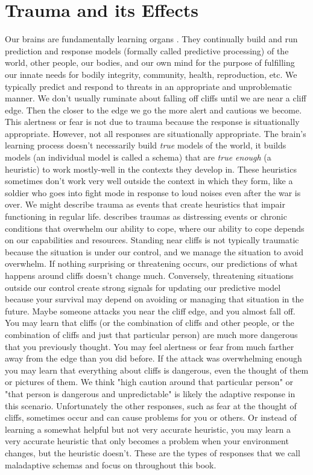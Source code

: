 \documentclass[12pt,letterpaper]{book}
\begin{document}
\section{Trauma and its Effects}
\label{sec:trauma}
Our brains are fundamentally learning organs \cite{eckerUnlocking,clark2015surfing}. They continually build and run prediction and response models (formally called predictive processing) of the world, other people, our bodies, and our own mind for the purpose of fulfilling our innate needs for bodily integrity, community, health, reproduction, etc. We typically predict and respond to threats in an appropriate and unproblematic manner. We don't usually ruminate about falling off cliffs until we are near a cliff edge. Then the closer to the edge we go the more alert and cautious we become. This alertness or fear is not due to trauma because the response is situationally appropriate. However, not all responses are situationally appropriate. The brain's learning process doesn't necessarily build \textit{true} models of the world, it builds models (an individual model is called a schema) that are \textit{true enough} (a heuristic) to work mostly-well in the contexts they develop in. These heuristics sometimes don't work very well outside the context in which they form, like a soldier who goes into fight mode in response to loud noises even after the war is over. We might describe trauma as events that create heuristics that impair functioning in regular life. \textcite{laneReconsolidation} describes traumas as distressing events or chronic conditions that overwhelm our ability to cope, where our ability to cope depends on our capabilities and resources. Standing near cliffs is not typically traumatic because the situation is under our control, and we manage the situation to avoid overwhelm. If nothing surprising or threatening occurs, our predictions of what happens around cliffs doesn't change much. Conversely, threatening situations outside our control create strong signals for updating our predictive model because your survival may depend on avoiding or managing that situation in the future. Maybe someone attacks you near the cliff edge, and you almost fall off. You may learn that cliffs (or the combination of cliffs and other people, or the combination of cliffs and just that particular person) are much more dangerous that you previously thought. You may feel alertness or fear from much farther away from the edge than you did before. If the attack was overwhelming enough you may learn that everything about cliffs is dangerous, even the thought of them or pictures of them. We think "high caution around that particular person" or "that person is dangerous and unpredictable" is likely the adaptive response in this scenario. Unfortunately the other responses, such as fear at the thought of cliffs, sometimes occur and can cause problems for you or others. Or instead of learning a somewhat helpful but not very accurate heuristic, you may learn a very accurate heuristic that only becomes a problem when your environment changes, but the heuristic doesn't. These are the types of responses that we call maladaptive schemas and focus on throughout this book.
\end{document}
